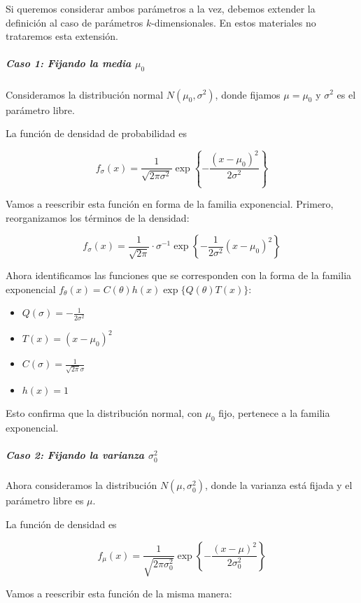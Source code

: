 \documentclass[
]{article}
\providecommand{\tightlist}{%
  \setlength{\itemsep}{0pt}\setlength{\parskip}{0pt}}
\begin{document}
Si queremos considerar ambos parámetros a la vez, debemos extender la definición al caso de parámetros \(k\)-dimensionales. En estos materiales no trataremos esta extensión.

\subparagraph{\texorpdfstring{Caso 1: Fijando la media \(\mu_0\)}{Caso 1: Fijando la media \textbackslash mu\_0}}\label{caso-1-fijando-la-media-mu_0}

Consideramos la distribución normal \(N(\mu_0, \sigma^2)\), donde fijamos \(\mu = \mu_0\) y \(\sigma^2\) es el parámetro libre.

La función de densidad de probabilidad es

\[f_{\sigma}(x) = \frac{1}{\sqrt{2\pi\sigma^2}} \exp\left\{-\frac{(x - \mu_0)^2}{2\sigma^2}\right\}\]

Vamos a reescribir esta función en forma de la familia exponencial. Primero, reorganizamos los términos de la densidad:

\[f_{\sigma}(x) = \frac{1}{\sqrt{2\pi}} \cdot \sigma^{-1} \exp\left\{-\frac{1}{2\sigma^2}(x - \mu_0)^2\right\}\]

Ahora identificamos las funciones que se corresponden con la forma de la familia exponencial \(f_{\theta}(x) = C(\theta) h(x) \exp\{Q(\theta) T(x)\}\):

\begin{itemize}
\tightlist
\item
  \(Q(\sigma) = -\frac{1}{2\sigma^2}\)
\item
  \(T(x) = (x - \mu_0)^2\)
\item
  \(C(\sigma) = \frac{1}{\sqrt{2\pi}\sigma}\)
\item
  \(h(x) = 1\)
\end{itemize}

Esto confirma que la distribución normal, con \(\mu_0\) fijo, pertenece a la familia exponencial.

\subparagraph{\texorpdfstring{Caso 2: Fijando la varianza \(\sigma_0^2\)}{Caso 2: Fijando la varianza \textbackslash sigma\_0\^{}2}}\label{caso-2-fijando-la-varianza-sigma_02}

Ahora consideramos la distribución \(N(\mu, \sigma_0^2)\), donde la varianza está fijada y el parámetro libre es \(\mu\).

La función de densidad es

\[f_{\mu}(x) = \frac{1}{\sqrt{2\pi\sigma_0^2}} \exp\left\{-\frac{(x - \mu)^2}{2\sigma_0^2}\right\}\]

Vamos a reescribir esta función de la misma manera:
\end{document}
